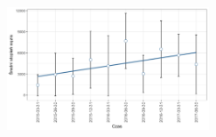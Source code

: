 \documentclass[]{beamer}
\newcommand{\sizequadsda}{0.45}
\begin{document}
\begin{frame}
\begin{minipage}{\textwidth}
			\includegraphics[width=\sizequadsda\textwidth]{pictures/sredni_stopien_wezla/sredni_stopien_wezla_sda.png}
 \end{minipage} 
\end{frame}
\end{document}
